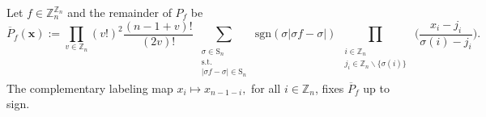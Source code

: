 \begin{proposition}\label{prop:complementary-labeling-Symmetry}
Let $f\in\mathbb{Z}_{n}^{\mathbb{Z}_{n}}$ and the remainder of $P_f$ be
\begin{equation}
\overline{P}_{f}(\mathbf{x}):=\prod_{v\in\mathbb{Z}_{n}}(v!)^{2}\frac{(n-1+v)!}{(2v)!}\sum_{\begin{array}{c}
\substack{\sigma\in\text{S}_{n}\\
\text{s.t.}\\
\left|\sigma f-\sigma\right|\in\text{S}_{n}
}
\end{array}}\text{sgn}(\sigma\left|\sigma f-\sigma\right|)\prod_{\begin{array}{c}
\substack{i\in\mathbb{Z}_{n}\\
j_{i}\in\mathbb{Z}_{n}\backslash\{\sigma(i)\}
}
\end{array}}\big(\frac{x_{i}-j_{i}}{\sigma(i)-j_{i}}\big).
\end{equation}
The complementary labeling map $x_{i}\mapsto x_{n-1-i},$ for all $i\in \mathbb{Z}_n$,
fixes $\overline{P}_f$ up to sign.
\end{proposition}
